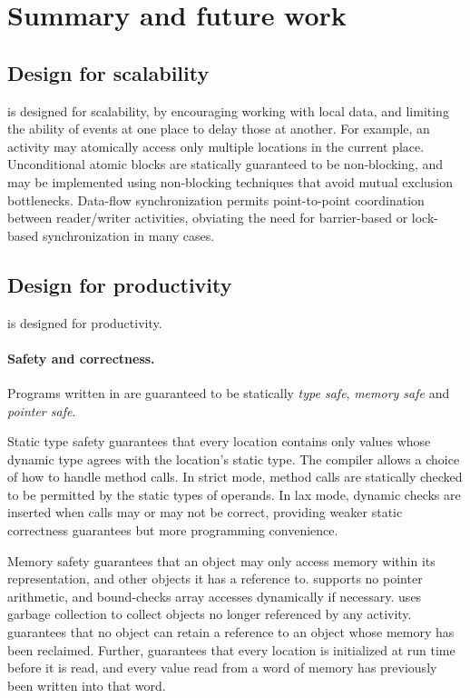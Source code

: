 \section{Summary and future work}
\subsection{Design for scalability}
\Xten{} is designed for scalability, by encouraging working with local data,
and limiting the ability of events at one place to delay those at another. For
example, an activity may atomically access only multiple locations in the
current place. Unconditional atomic blocks are statically guaranteed to be
non-blocking, and may be implemented using non-blocking techniques that avoid
mutual exclusion bottlenecks. Data-flow synchronization permits point-to-point
coordination between reader/writer activities, obviating the need for
barrier-based or lock-based synchronization in many cases.

\subsection{Design for productivity}
\Xten{} is designed for productivity.

\paragraph{Safety and correctness.}


Programs written in \Xten{} are guaranteed to be statically
\emph{type safe}, \emph{memory safe} and \emph{pointer safe}. 

Static type safety guarantees that every location contains only values whose
dynamic type agrees with the location's static type. The compiler allows a
choice of how to handle method calls. In strict mode, method calls are
statically checked to be permitted by the static types of operands. In lax
mode, dynamic checks are inserted when calls may or may not be correct,
providing weaker static correctness guarantees but more programming
convenience. 

Memory safety guarantees that an object may only access memory within its
representation, and other objects it has a reference to. \Xten{} supports no
pointer arithmetic, and bound-checks array accesses dynamically if necessary.
\Xten{} uses garbage collection to collect objects no longer referenced by any
activity. \Xten{} guarantees that no object can retain a reference to an
object whose memory has been reclaimed. Further, \Xten{} guarantees that every
location is initialized at run time before it is read, and every value read
from a word of memory has previously been written into that word.

